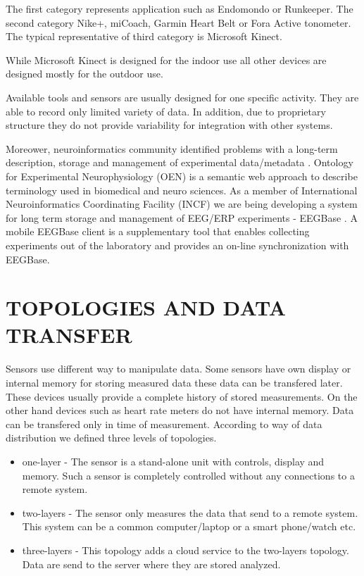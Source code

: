 \documentclass[a4paper,twoside]{article}
\begin{document}
The first category represents application such as Endomondo or Runkeeper. The second category Nike+, miCoach, Garmin Heart Belt or Fora Active tonometer. The typical representative of third category is Microsoft Kinect.

While Microsoft Kinect is designed for the indoor use all other devices are designed mostly for the outdoor use. 

Available tools and sensors are usually designed for one specific activity. They are able to record only limited variety of data. In addition, due to proprietary structure they do not provide variability for integration with other systems. 

Moreower, neuroinformatics community identified problems with a long-term description, storage and management of experimental data/metadata \cite{CRCNS}. Ontology for Experimental Neurophysiology (OEN) \cite{10.3389/conf.fninf.2014.18.00044} is a semantic web approach to describe terminology used in biomedical and neuro sciences. As a member of International Neuroinformatics Coordinating Facility (INCF) \cite{INCF} we are being developing a system for long term storage and management of EEG/ERP experiments - EEGBase \cite{ISI:000306821100004}. A mobile EEGBase client \cite{10.3389/conf.fninf.2013.09.00046} is a supplementary tool that enables collecting experiments out of the laboratory and provides an on-line synchronization with EEGBase.


\section{\uppercase{Topologies and Data Transfer}}
\label{topology_data_transfer}

\noindent 
Sensors use different way to manipulate data. Some sensors have own display or internal memory for storing measured data these data can be transfered later. These devices usually provide a complete history of stored measurements. On the other hand devices such as heart rate meters do not have internal memory. Data can be transfered only in time of measurement. According to way of data distribution we defined three levels of topologies.

\begin{itemize}
 \item one-layer - The sensor is a stand-alone unit with controls, display and memory. Such a sensor is completely controlled without any connections to a remote system.   
 \item two-layers - The sensor only measures the data that send to a remote system. This system can be a common computer/laptop or a smart phone/watch etc. 
 \item three-layers - This topology adds a cloud service to the two-layers topology. Data are send to the server where they are stored analyzed. 
\end{itemize}
\end{document}
